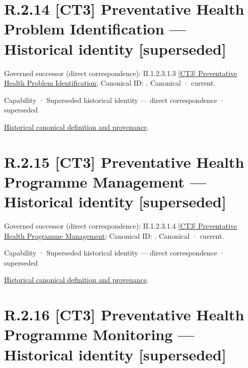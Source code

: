 \section*{R.2.14 [CT3] Preventative Health Problem Identification — Historical identity [superseded]}
\label{navigation:R.2.14}

{\small Governed successor (direct correspondence): II.1.2.3.1.3 \hyperref[element:c1567022671f433fa1eeb37a9d156d92]{[CT3] Preventative Health Problem Identification}; Canonical ID: \texttt{}. Canonical · current.}\par
\label{element:b35d3521141c419fb676a79b2ede40bd}
{\small Capability · Superseded historical identity — direct correspondence · superseded}\par
\href{../../../../../../../continuum/strategy/capability/b35d3521141c419fb676a79b2ede40bd.md}{Historical canonical definition and provenance}.\par
\section*{R.2.15 [CT3] Preventative Health Programme Management — Historical identity [superseded]}
\label{navigation:R.2.15}

{\small Governed successor (direct correspondence): II.1.2.3.1.4 \hyperref[element:563d36b179d34cb6913253d06e8d77f6]{[CT3] Preventative Health Programme Management}; Canonical ID: \texttt{}. Canonical · current.}\par
\label{element:d71def9e76a544ff9761c672bb24f3be}
{\small Capability · Superseded historical identity — direct correspondence · superseded}\par
\href{../../../../../../../continuum/strategy/capability/d71def9e76a544ff9761c672bb24f3be.md}{Historical canonical definition and provenance}.\par
\section*{R.2.16 [CT3] Preventative Health Programme Monitoring — Historical identity [superseded]}
\label{navigation:R.2.16}

